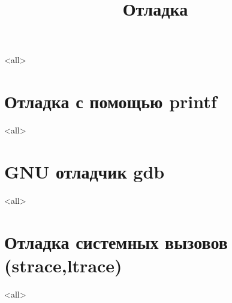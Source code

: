 

\title[Отладка]{Отладка}





\begin{frame}
	\frametitle{}
	\titlepage
	\vspace{-0.5cm}
	\begin{center}
	\end{center}
\end{frame}

\begin{frame}
	\tableofcontents
\end{frame}



\mode<all>{}

\section{Отладка с помощью printf}

\mode<all>{}

\section{GNU отладчик gdb}
\mode<all>{}

\section{Отладка системных вызовов (strace,ltrace)}
\mode<all>{}




